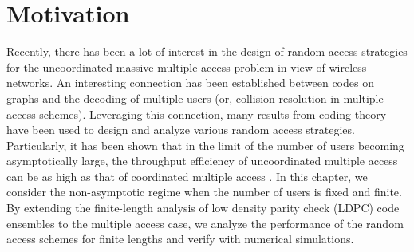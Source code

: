 

\section{Motivation}
Recently, there has been a lot of interest in the design of random access strategies for the uncoordinated massive multiple access problem in view of wireless networks. An interesting connection has been established between codes on graphs and the decoding of multiple users (or, collision resolution in multiple access schemes). Leveraging this connection, many results from coding theory have been used to design and analyze various random access strategies. Particularly, it has been shown that in the limit of the number of users becoming asymptotically large, the throughput efficiency of uncoordinated multiple access can be as high as that of coordinated multiple access \cite{narayanan2012iterative}. In this chapter, we consider the non-asymptotic regime when the number of users is fixed and finite. By extending the finite-length analysis of low density parity check (LDPC) code ensembles \cite{amraoui2007find} to the multiple access case, we analyze the performance of the random access schemes for finite lengths and verify with numerical simulations.

